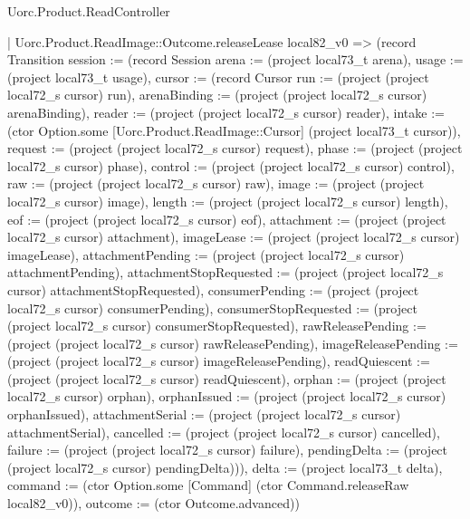 \begin{lexlean}{Uorc.Product.ReadController}
\begin{semanticmodule}
{    | Uorc.Product.ReadImage::Outcome.releaseLease local82_v0 => (record Transition {session := (record Session {arena := (project local73_t arena), usage := (project local73_t usage), cursor := (record Cursor {run := (project (project local72_s cursor) run), arenaBinding := (project (project local72_s cursor) arenaBinding), reader := (project (project local72_s cursor) reader), intake := (ctor Option.some [Uorc.Product.ReadImage::Cursor] (project local73_t cursor)), request := (project (project local72_s cursor) request), phase := (project (project local72_s cursor) phase), control := (project (project local72_s cursor) control), raw := (project (project local72_s cursor) raw), image := (project (project local72_s cursor) image), length := (project (project local72_s cursor) length), eof := (project (project local72_s cursor) eof), attachment := (project (project local72_s cursor) attachment), imageLease := (project (project local72_s cursor) imageLease), attachmentPending := (project (project local72_s cursor) attachmentPending), attachmentStopRequested := (project (project local72_s cursor) attachmentStopRequested), consumerPending := (project (project local72_s cursor) consumerPending), consumerStopRequested := (project (project local72_s cursor) consumerStopRequested), rawReleasePending := (project (project local72_s cursor) rawReleasePending), imageReleasePending := (project (project local72_s cursor) imageReleasePending), readQuiescent := (project (project local72_s cursor) readQuiescent), orphan := (project (project local72_s cursor) orphan), orphanIssued := (project (project local72_s cursor) orphanIssued), attachmentSerial := (project (project local72_s cursor) attachmentSerial), cancelled := (project (project local72_s cursor) cancelled), failure := (project (project local72_s cursor) failure), pendingDelta := (project (project local72_s cursor) pendingDelta)})}), delta := (project local73_t delta), command := (ctor Option.some [Command] (ctor Command.releaseRaw local82_v0)), outcome := (ctor Outcome.advanced)})
}
\end{semanticmodule}
\end{lexlean}
